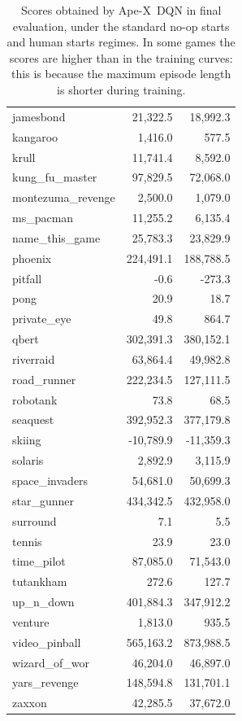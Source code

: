 \documentclass{article} %
\def\apex{Ape-X}
\def\smallcaption#1{\caption{\small #1}\vspace{-0.4cm}}
\begin{document}
\begin{table}
\begin{tabular}{lrr}
         jamesbond &   21,322.5 &   18,992.3 \\
          kangaroo &    1,416.0 &      577.5 \\
             krull &   11,741.4 &    8,592.0 \\
    kung\_fu\_master &   97,829.5 &   72,068.0 \\
 montezuma\_revenge &    2,500.0 &    1,079.0 \\
         ms\_pacman &   11,255.2 &    6,135.4 \\
    name\_this\_game &   25,783.3 &   23,829.9 \\
           phoenix &  224,491.1 &  188,788.5 \\
           pitfall &       -0.6 &     -273.3 \\
              pong &       20.9 &       18.7 \\
       private\_eye &       49.8 &      864.7 \\
             qbert &  302,391.3 &  380,152.1 \\
         riverraid &   63,864.4 &   49,982.8 \\
       road\_runner &  222,234.5 &  127,111.5 \\
          robotank &       73.8 &       68.5 \\
          seaquest &  392,952.3 &  377,179.8 \\
            skiing &  -10,789.9 &  -11,359.3 \\
           solaris &    2,892.9 &    3,115.9 \\
    space\_invaders &   54,681.0 &   50,699.3 \\
       star\_gunner &  434,342.5 &  432,958.0 \\
          surround &        7.1 &        5.5 \\
            tennis &       23.9 &       23.0 \\
        time\_pilot &   87,085.0 &   71,543.0 \\
         tutankham &      272.6 &      127.7 \\
         up\_n\_down &  401,884.3 &  347,912.2 \\
           venture &    1,813.0 &      935.5 \\
     video\_pinball &  565,163.2 &  873,988.5 \\
     wizard\_of\_wor &   46,204.0 &   46,897.0 \\
      yars\_revenge &  148,594.8 &  131,701.1 \\
            zaxxon &   42,285.5 &   37,672.0 \\
\bottomrule
\end{tabular}
\smallcaption{Scores obtained by \apex\ DQN in final evaluation, under the standard no-op starts and human starts regimes. In some games the scores are higher than in the training curves: this is because the maximum episode length is shorter during training.}
\end{table}
\end{document}
